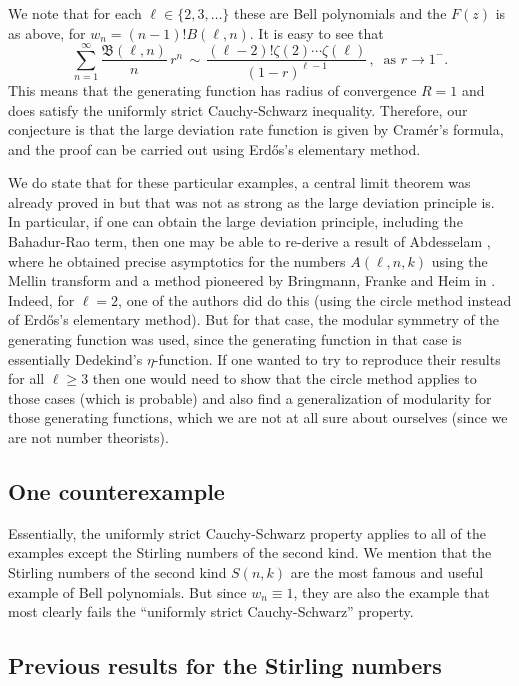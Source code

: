 \documentclass[12pt]{article}
\begin{document}
We note that for each $\ell \in \{2,3,\dots\}$ these are Bell polynomials and the $F(z)$ is as above, for $w_n = (n-1)! B(\ell,n)$.
It is easy to see that
$$
\sum_{n=1}^{\infty} \frac{\mathfrak{B}(\ell,n)}{n}\, r^n\, \sim\, \frac{(\ell-2)! \zeta(2)\cdots \zeta(\ell)}{(1-r)^{\ell-1}}\, ,\ \text{ as $r \to 1^-$.}
$$
This means that the generating function has radius of convergence $R=1$ and does satisfy the uniformly strict Cauchy-Schwarz inequality.
Therefore, our conjecture is that the large deviation rate function is given by Cram\'er's formula,
and the proof can be carried out using Erd\H{o}s's elementary method.

We do state that for these particular examples, a central limit theorem was already proved in \cite{AbdesselamStarr}
but that was not as strong as the large deviation principle is.
In particular, if one can obtain the large deviation principle, including the Bahadur-Rao term, then 
one may be able to re-derive a result of Abdesselam \cite{Abdesselam2}, where he obtained precise asymptotics
for the numbers $A(\ell,n,k)$ using the Mellin transform and a method pioneered by Bringmann, Franke and Heim in \cite{BFH}.
Indeed, for $\ell=2$, one of the authors did do this (using the circle method instead of Erd\H{o}s's elementary method).
But for that case, the modular symmetry of the generating function was used, since the generating function in that case is 
essentially Dedekind's $\eta$-function.
If one wanted to try to reproduce their results for all $\ell\geq 3$ then one would need to show that the circle method
applies to those cases (which is probable) and also find a generalization of modularity for those generating functions,
which we are not at all sure about ourselves (since we are not number theorists).

\subsection{One counterexample}

Essentially, the uniformly strict Cauchy-Schwarz property applies to all of the examples except the Stirling numbers of the second kind.
We mention that the Stirling numbers of the second kind $S(n,k)$ are the most famous and useful example of Bell polynomials.
But since $w_n\equiv 1$, they are also the example that most clearly fails the ``uniformly strict Cauchy-Schwarz'' property.


\subsection{Previous results for the Stirling numbers}
\end{document}
